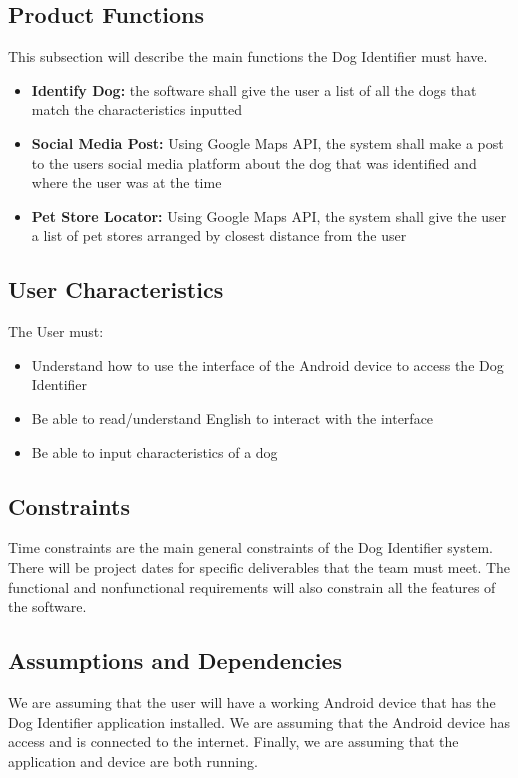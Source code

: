 \documentclass[]{article}
\begin{document}
\subsection{Product Functions}
\label{sub:product_functions}
This subsection will describe the main functions the Dog Identifier must have.

\begin{itemize}
	\item \textbf{Identify Dog:} the software  shall give the user a list of all the dogs that match the characteristics inputted
	\item \textbf{Social Media Post:} Using Google Maps API, the system shall make a post to the users social media platform about the dog that was identified and where the user was at the time
	\item \textbf{Pet Store Locator:} Using Google Maps API, the system shall give the user a list of pet stores arranged by closest distance from the user
\end{itemize}

\subsection{User Characteristics}
\label{sub:user_characteristics}
The User must:
\begin{itemize}
	\item Understand how to use the interface of the Android device to access the Dog Identifier
	\item Be able to read/understand English to interact with the interface
	\item Be able to input characteristics of a dog
\end{itemize}

\subsection{Constraints}
\label{sub:constraints}
Time constraints are the main general constraints of the Dog Identifier system. There will be project dates for specific deliverables that the team must meet. The functional and nonfunctional requirements will also constrain all the features of the software.

\subsection{Assumptions and Dependencies}
\label{sub:assumptions_and_dependencies}
We are assuming that the user will have a working Android device that has the Dog Identifier application installed. We are assuming that the Android device has access and is connected to the internet. Finally, we are assuming that the application and device are both running.
\end{document}
